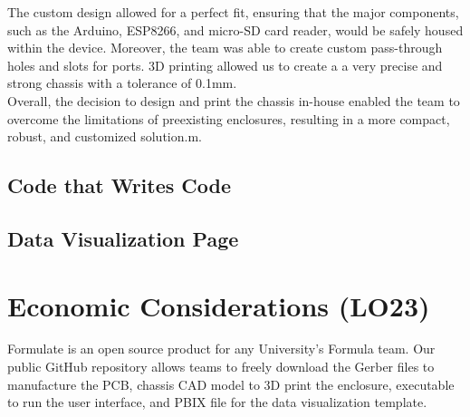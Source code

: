 \documentclass[12pt]{article}
\begin{document}
The custom design allowed for a perfect fit, ensuring that the major components, such as the Arduino, ESP8266, and micro-SD card reader, would be safely housed within the device. Moreover, the team was able to create custom pass-through holes and slots for ports. 3D printing allowed us to create a a very precise and strong chassis with a tolerance of 0.1mm.\\

Overall, the decision to design and print the chassis in-house enabled the team to overcome the limitations of preexisting enclosures, resulting in a more compact, robust, and customized solution.m.

\subsection{Code that Writes Code}

\subsection{Data Visualization Page}






\section{Economic Considerations (LO23)}


Formulate is an open source product for any University's Formula team. Our public GitHub repository allows teams to freely download the Gerber files to manufacture the PCB, chassis CAD model to 3D print the enclosure, executable to run the user interface, and PBIX file for the data visualization template. \\
\end{document}

